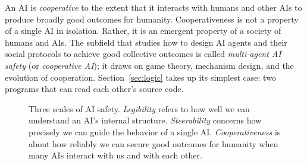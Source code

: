 An AI is \emph{cooperative} to the extent that it interacts with humans and other AIs to produce broadly good outcomes for humanity. Cooperativeness is not a property of a single AI in isolation. Rather, it is an emergent property of a society of humans and AIs. The subfield that studies how to design AI agents and their social protocols to achieve good collective outcomes is called \emph{multi-agent AI safety} (or \emph{cooperative AI}); it draws on game theory, mechanism design, and the evolution of cooperation. Section~\ref{sec:logic} takes up its simplest case: two programs that can read each other's source code.

\begin{figure}[ht]
\centering
{}
\caption{Three scales of AI safety. \emph{Legibility} refers to how well we can understand an AI's internal structure. \emph{Steerability} concerns how precisely we can guide the behavior of a single AI. \emph{Cooperativeness} is about how reliably we can secure good outcomes for humanity when many AIs interact with us and with each other.}
\label{fig:three-scales}
\end{figure}

